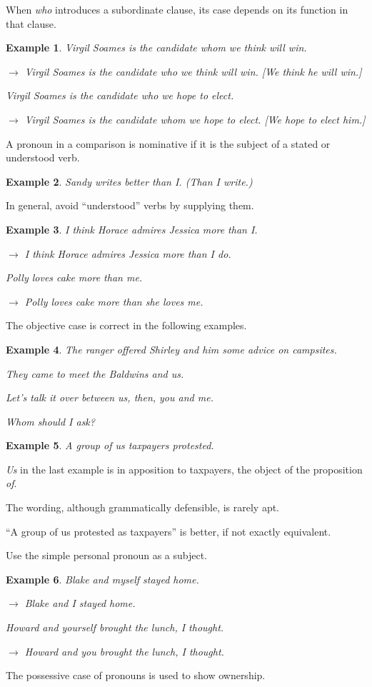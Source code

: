 \documentclass{book}
\numberwithin{equation}{section}
\newtheorem{example}{Example}[chapter]
\begin{document}
When \textit{who} introduces a subordinate clause, its case depends on its function in that clause.
\begin{example}
    Virgil Soames is the candidate whom we think will win.
    
    $\to$ Virgil Soames is the candidate who we think will win. [We think \emph{he} will win.]
    
    Virgil Soames is the candidate who we hope to elect.
    
    $\to$ Virgil Soames is the candidate whom we hope to elect. [We hope to elect \emph{him}.]
\end{example}
A pronoun in a comparison is nominative if it is the subject of a stated or understood verb.
\begin{example}
    Sandy writes better than I. (Than I write.)
\end{example}
In general, avoid ``understood'' verbs by supplying them.
\begin{example}
    I think Horace admires Jessica more than I.
    
    $\to$ I think Horace admires Jessica more than I do.
    
    Polly loves cake more than me.
    
    $\to$ Polly loves cake more than she loves me.
\end{example}
The objective case is correct in the following examples.
\begin{example}
    The ranger offered Shirley and him some advice on campsites.
    
    They came to meet the Baldwins and us.
    
    Let's talk it over between us, then, you and me.
    
    Whom should I ask?
\end{example}

\begin{example}
    A group of us taxpayers protested.
\end{example}
\textit{Us} in the last example is in apposition to taxpayers, the object of the proposition \textit{of}.

The wording, although grammatically defensible, is rarely apt.

``A group of us protested as taxpayers'' is better, if not exactly equivalent.

%
Use the simple personal pronoun as a subject.
\begin{example}
    Blake and myself stayed home.
    
    $\to$ Blake and I stayed home.
    
    Howard and yourself brought the lunch, I thought.
    
    $\to$ Howard and you brought the lunch, I thought.
\end{example}
The possessive case of pronouns is used to show ownership.
\end{document}

